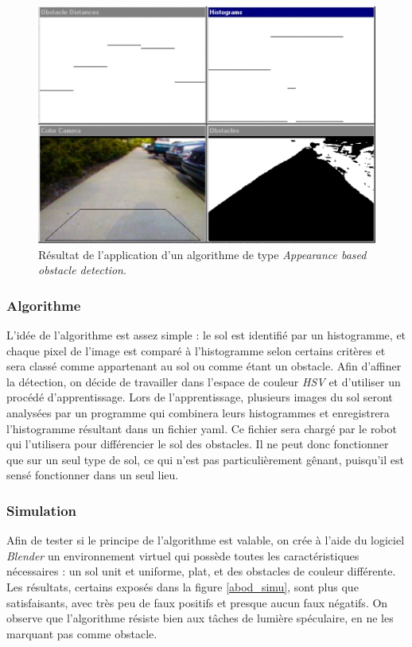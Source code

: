 \documentclass{article}
\begin{document}
\begin{figure}
    \begin{center}
        \includegraphics[width=0.8\linewidth]{rcs/abod.png}
    \end{center}
    \caption{Résultat de l'application d'un algorithme de type \emph{Appearance based obstacle detection}.}
    \label{abod}
\end{figure}

\subsubsection{Algorithme} L'idée de l'algorithme est assez simple : le sol est identifié par un histogramme, et chaque pixel de l'image est comparé à l'histogramme selon certains critères et sera classé comme appartenant au sol ou comme étant un obstacle. Afin d'affiner la détection, on décide de travailler dans l'espace de couleur \emph{HSV} et d'utiliser un procédé d'apprentissage. Lors de l'apprentissage, plusieurs images du sol seront analysées par un programme qui combinera leurs histogrammes et enregistrera l'histogramme résultant dans un fichier yaml. Ce fichier sera chargé par le robot qui l'utilisera pour différencier le sol des obstacles. Il ne peut donc fonctionner que sur un seul type de sol, ce qui n'est pas particulièrement gênant, puisqu'il est sensé fonctionner dans un seul lieu.

\subsubsection{Simulation} Afin de tester si le principe de l'algorithme est valable, on crée à l'aide du logiciel \emph{Blender} un environnement virtuel qui possède toutes les caractéristiques nécessaires : un sol unit et uniforme, plat, et des obstacles de couleur différente. Les résultats, certains exposés dans la figure \ref{abod_simu}, sont plus que satisfaisants, avec très peu de faux positifs et presque aucun faux négatifs. On observe que l'algorithme résiste bien aux tâches de lumière spéculaire, en ne les marquant pas comme obstacle.
\end{document}
